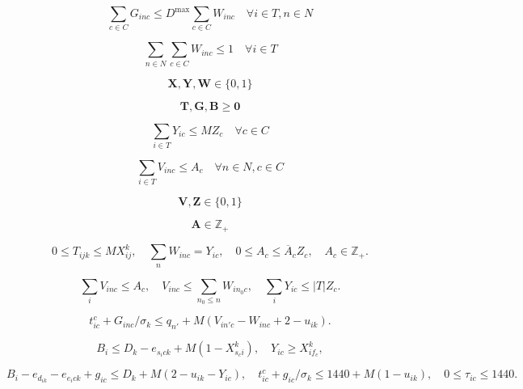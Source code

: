 \documentclass[10pt]{article}
\begin{document}
\begin{equation}
\sum_{c \in C} G_{inc} \le D^{\max} \sum_{c \in C} W_{inc} \quad \forall i \in T, n \in N \tag{14}
\end{equation}

\begin{equation}
\sum_{n \in N} \sum_{c \in C} W_{inc} \le 1 \quad \forall i \in T \tag{15}
\end{equation}

\begin{equation}
\boldsymbol{X}, \boldsymbol{Y}, \boldsymbol{W} \in \{0, 1\} \tag{16}
\end{equation}

\begin{equation}
\boldsymbol{T}, \boldsymbol{G}, \boldsymbol{B} \ge \boldsymbol{0} \tag{17}
\end{equation}

\begin{equation}
\sum_{i \in T} Y_{ic} \le M Z_c \quad \forall c \in C \tag{19}
\end{equation}

\begin{equation}
\sum_{i \in T} V_{inc} \le A_c \quad \forall n \in N, c \in C \tag{21}
\end{equation}

\begin{equation}
\boldsymbol{V}, \boldsymbol{Z} \in \{0, 1\} \tag{22}
\end{equation}

\begin{equation}
\boldsymbol{A}\in\mathbb Z_+ \tag{23}
\end{equation}

\[
0\le T_{ijk}\le MX^k_{ij},\quad
\sum_nW_{inc}=Y_{ic},\quad
0\le A_c\le \overline A_cZ_c,\quad A_c\in\mathbb Z_+.
\]

\[
\sum_iV_{inc}\le A_c,\quad V_{inc}\le\sum_{n_0\le n}W_{in_0c},\quad
\sum_iY_{ic}\le|T|Z_c.
\]

\[
t^c_{ic}+G_{inc}/\sigma_k
\le q_{n'}+M(V_{in'c}-W_{inc}+2-u_{ik}).
\]

\[
B_i\le D_k-e_{s_ic k}+M(1-X^k_{s_ci}),\quad Y_{ic}\ge X^k_{if_c},
\]

\[
B_i-e_{d_{ik}}-e_{e_ic k}+g_{ic}\le D_k+M(2-u_{ik}-Y_{ic}),\quad
t^c_{ic}+g_{ic}/\sigma_k\le1440+M(1-u_{ik}),\quad0\le\tau_{ic}\le1440.
\]
\end{document}
